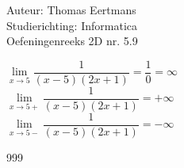\documentclass[a4paper]{article}
\begin{document}
  
\noindent \large Auteur: Thomas Eertmans \\
\noindent \large Studierichting: Informatica\\
\noindent \large Oefeningenreeks 2D nr. 5.9\\

\medskip

\normalsize

$\lim\limits_{x\rightarrow 5} \dfrac{1}{(x-5)(2x+1)} = \dfrac{1}{0} = \infty$ \\

$\lim\limits_{x\rightarrow 5+} \dfrac{1}{(x-5)(2x+1)} = +\infty$ \\

$\lim\limits_{x\rightarrow 5-} \dfrac{1}{(x-5)(2x+1)} = -\infty$ \\

\begin{thebibliography}{999}
\end{thebibliography}
\end{document}
